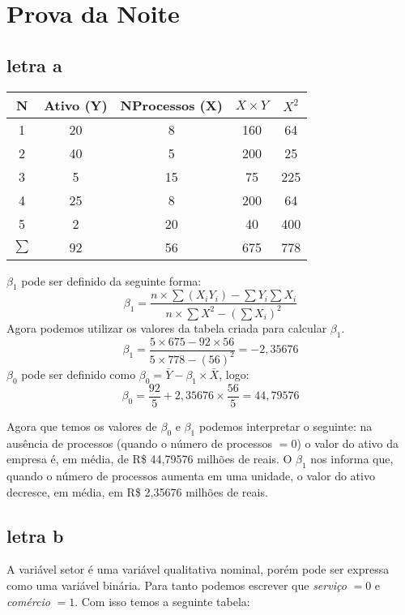 \chapter{Prova da Noite}
\section*{letra a}
\begin{center}
    \begin{tabular}{|c|c|c|c|c|}
        \hline
        N & Ativo (Y) & NProcessos (X) & \(X \times Y\) & \(X^2\)  \\ \hline
        1 & 20 & 8 & 160 & 64 \\ \hline
        2 & 40 & 5 & 200 & 25 \\ \hline
        3 & 5 & 15 & 75 & 225 \\ \hline
        4 & 25 & 8 & 200 & 64 \\ \hline
        5 & 2 & 20 & 40 & 400 \\ \hline
        \(\sum\) & 92 & 56 & 675 & 778 \\ \hline
    \end{tabular}
\end{center}
\(\beta_{1}\) pode ser definido da seguinte forma:
\[\beta_{1} = \frac{n \times \sum (X_{i}Y_{i}) - \sum Y_{i}\sum X_{i}}{n \times \sum X^2 - (\sum X_{i})^2}\]
Agora podemos utilizar os valores da tabela criada para calcular \(\beta_{1}\).
\[ \beta_{1} = \frac{5 \times 675 - 92 \times 56}{5 \times 778 - (56)^2} = -2,35676 \]
\(\beta_{0}\) pode ser definido como \(\beta_{0} = \bar{Y} - \beta_{1} \times \bar{X}\), logo:
\[ \beta_{0} = \frac{92}{5} + 2,35676 \times \frac{56}{5} = 44,79576 \]

Agora que temos os valores de \(\beta_{0}\) e \(\beta_{1}\) podemos interpretar o seguinte: na ausência de processos (quando o número de processos \(= 0\)) o valor do ativo da empresa é, em média, de R\$ 44,79576 milhões de reais. O \(\beta_{1}\) nos informa que, quando o número de processos aumenta em uma unidade, o valor do ativo decresce, em média, em R\$ 2,35676 milhões de reais.

\section*{letra b}
A variável setor é uma variável qualitativa nominal, porém pode ser expressa como uma variável binária. Para tanto podemos escrever que \textit{serviço} \(= 0\) e \textit{comércio} \(= 1\). Com isso temos a seguinte tabela:

